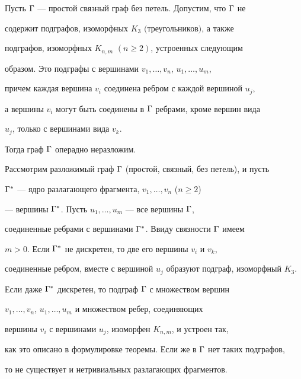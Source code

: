 \begin{thm}


Пусть ${\Gamma}$ --- простой связный граф без петель. Допустим, что ${\Gamma}$ не 


содержит подграфов, изоморфных $K_3$ $($треугольников$)$, а также 


подграфов, изоморфных $K_{n, m}$ $(n\geq 2)$, устроенных следующим 


образом. Это подграфы с вершинами $v_1,\dotsc , v_n$, $u_1,\dotsc , u_m$,


причем каждая вершина $v_i$ соединена ребром с каждой вершиной $u_j$, 


а вершины $v_i$ могут быть соединены в ${\Gamma}$ ребрами, кроме вершин вида 


$u_j$, только с вершинами вида $v_k$. 


Тогда граф ${\Gamma}$ операдно неразложим.


\end{thm} 





\begin{pf}


Рассмотрим разложимый граф ${\Gamma}$ (простой, связный, без петель), и пусть 


${\Gamma}^*$ --- ядро разлагающего фрагмента, $v_1,\dotsc , v_n$ ($n\geq 2$) 


--- вершины ${\Gamma}^*$. Пусть $u_1,\dotsc , u_m$ --- все вершины ${\Gamma}$, 


соединенные ребрами с вершинами ${\Gamma}^*$. Ввиду связности ${\Gamma}$ имеем 


$m>0$. Если ${\Gamma}^*$ не дискретен, то две его вершины $v_i$ и $v_k$,


соединенные ребром, вместе с вершиной $u_j$ образуют подграф, изоморфный $K_3$.


Если даже ${\Gamma}^*$ дискретен, то подграф ${\Gamma}$ с множеством вершин


$v_1,\dotsc , v_n$, $u_1,\dotsc , u_m$ и множеством ребер, соединяющих 


вершины $v_i$ с вершинами $u_j$, изоморфен $K_{n, m}$, и устроен так, 


как это описано в формулировке теоремы. Если же в ${\Gamma}$ нет таких подграфов, 


то не существует и нетривиальных разлагающих фрагментов.


\end{pf}





